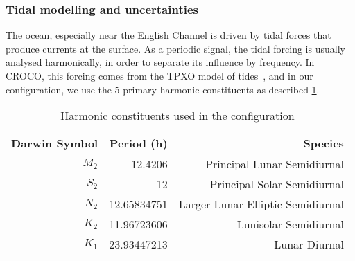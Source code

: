 \documentclass[../../Main_ManuscritThese.tex]{subfiles}
\newcommand{\CROCO}{CROCO}
\begin{document}
\subsubsection{Tidal modelling and uncertainties}
\label{ssec:tidal_modelling}
The ocean, especially near the English Channel is driven by tidal
forces that produce currents at the surface. As a periodic signal, the
tidal forcing is usually analysed harmonically, in order to separate
its influence by frequency. In \CROCO, this forcing comes from the
TPXO model of tides~\citep{egbert_efficient_2002}, and in our
configuration, we use the 5 primary harmonic constituents
as described \cref{tab:tides_components}.
\begin{table}[!h]
  \centering
  \begin{tabular}{rrr}\toprule
    Darwin Symbol & Period (h)   & Species                           \\ \midrule
    $M_2$         & 12.4206      & Principal Lunar Semidiurnal       \\
    $S_2$         & 12           & Principal Solar Semidiurnal       \\
    $N_2$         & 12.65834751  & Larger Lunar Elliptic Semidiurnal \\
    $K_2$         & 11.96723606  & Lunisolar Semidiurnal             \\
    $K_1$         & 23.93447213  & Lunar Diurnal                     \\
    \bottomrule
  \end{tabular}
  \caption{Harmonic constituents used in the configuration}
  \label{tab:tides_components}
\end{table}
\end{document}
